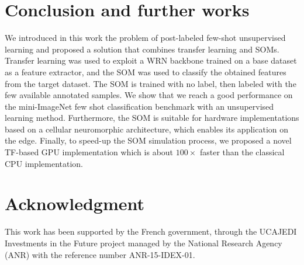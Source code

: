 \documentclass[runningheads]{llncs}
\begin{document}
\section{Conclusion and further works}
\label{sec_conclusion}
We introduced in this work the problem of post-labeled few-shot unsupervised learning and proposed a solution that combines transfer learning and SOMs. Transfer learning was used to exploit a WRN backbone trained on a base dataset as a feature extractor, and the SOM was used to classify the obtained features from the target dataset. The SOM is trained with no label, then labeled with the few available annotated samples. We show that we reach a good performance on the mini-ImageNet few shot classification benchmark with an unsupervised learning method. Furthermore, the SOM is suitable for hardware implementations based on a cellular neuromorphic architecture, which enables its application on the edge. Finally, to speed-up the SOM simulation process, we proposed a novel TF-based GPU implementation which is about $100\times$ faster than the classical CPU implementation.



\section*{Acknowledgment}
This work has been supported by the French government, through the UCAJEDI Investments in the Future project managed by the National Research Agency (ANR) with the reference number ANR-15-IDEX-01.
\end{document}
